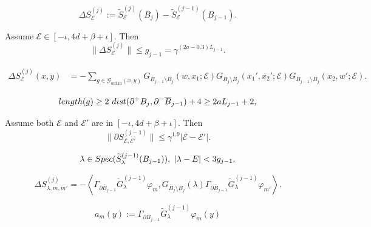 \documentclass[10pt,a4paper]{amsart}
\newcommand{\barB}{\overline{B}}
\newcommand{\diffSj}{\Delta {S}^{(j)}}
\newcommand{\dist}{{\rm dist}}
\newcommand{\length}{{\rm length}}
\newcommand{\mcE}{\mathcal{E}}
\newcommand{\mcG}{\mathcal{G}}
\newcommand{\partialSjminusone}{\partial {S}^{(j-1)}}
\newcommand{\spec}{{\rm Spec}}
\newcommand{\wtGjminusone}{\widetilde{G}^{(j-1)}}
\newcommand{\wtSjminusone}{\widetilde{S}^{(j-1)}}
\newcommand{\wtSj}{\widetilde{S}^{(j)}}
\begin{document}
\begin{equation}\label{difference in scales}
    \diffSj_\mcE := \wtSj_\mcE(B_j)-\wtSjminusone_\mcE(B_{j-1}).
\end{equation}

\begin{claim}\label{estimate on difference in scales}
    Assume $\mcE\in [-\iota,4d+\beta+\iota]$. Then 
  \[ \| \diffSj_\mcE  \| \leq g_{j-1}=\gamma^{(2a-0.3)L_{j-1}}.\]
\end{claim}

  \begin{align}\label{random walk expansion}
      \diffSj_\mcE (x,y) &= - \sum_{g\in \mcG_{\text{out,in}}(x,y) } G_{\barB_{j-1}\setminus B_{j}}(w,x_1;\mcE)   G_{\barB_j\setminus B_j}(x_1',x_2';\mcE)  G_{\barB_{j-1}\setminus B_{j}}(x_2,w';\mcE).  
  \end{align} 

  \begin{equation}\label{length of in and out path}
    \length(g)\geq 2\ \dist(\partial^+ B_j ,\partial^-\barB_{j-1})+4 \geq 2a L_{j-1}+2, 
  \end{equation}

\begin{claim}\label{estimate on difference in energy}
  Assume both $\mcE$ and $\mcE'$ are in $ [-\iota,4d+\beta+\iota]$. Then 
  \[ \| \partialSjminusone_{\mcE,\mcE'}  \| \leq \gamma^{1.9}|\mcE-\mcE'|.\]
\end{claim}

\begin{equation}\label{distance of lambda and E}
  \lambda \in \spec(\wtSjminusone_{\lambda}(B_{j-1})),\ |\lambda-E|<3g_{j-1}.
\end{equation}

\begin{equation}\label{elements under eigenbasis}
  \diffSj_{\lambda,m,m'}=-\left\langle \Gamma_{\partial \barB_{j-1}}  \wtGjminusone_{\lambda} \varphi_m,   G_{\barB_j\setminus B_j}(\lambda)  \Gamma_{\partial \barB_{j-1}} \wtGjminusone_{\lambda} \varphi_{m'} \right\rangle.
\end{equation}

\begin{equation}\label{define a(y)}
  a_m(y):= \Gamma_{\partial \barB_{j-1}}  \wtGjminusone_{\lambda} \varphi_m (y)
\end{equation}
\end{document}
